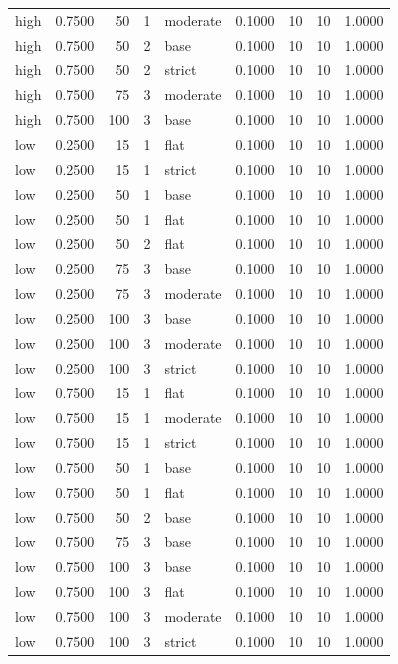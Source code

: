 \begin{tabular}{lrrrlrrrr}
high & 0.7500 & 50 & 1 & moderate & 0.1000 & 10 & 10 & 1.0000 \\
high & 0.7500 & 50 & 2 & base & 0.1000 & 10 & 10 & 1.0000 \\
high & 0.7500 & 50 & 2 & strict & 0.1000 & 10 & 10 & 1.0000 \\
high & 0.7500 & 75 & 3 & moderate & 0.1000 & 10 & 10 & 1.0000 \\
high & 0.7500 & 100 & 3 & base & 0.1000 & 10 & 10 & 1.0000 \\
low & 0.2500 & 15 & 1 & flat & 0.1000 & 10 & 10 & 1.0000 \\
low & 0.2500 & 15 & 1 & strict & 0.1000 & 10 & 10 & 1.0000 \\
low & 0.2500 & 50 & 1 & base & 0.1000 & 10 & 10 & 1.0000 \\
low & 0.2500 & 50 & 1 & flat & 0.1000 & 10 & 10 & 1.0000 \\
low & 0.2500 & 50 & 2 & flat & 0.1000 & 10 & 10 & 1.0000 \\
low & 0.2500 & 75 & 3 & base & 0.1000 & 10 & 10 & 1.0000 \\
low & 0.2500 & 75 & 3 & moderate & 0.1000 & 10 & 10 & 1.0000 \\
low & 0.2500 & 100 & 3 & base & 0.1000 & 10 & 10 & 1.0000 \\
low & 0.2500 & 100 & 3 & moderate & 0.1000 & 10 & 10 & 1.0000 \\
low & 0.2500 & 100 & 3 & strict & 0.1000 & 10 & 10 & 1.0000 \\
low & 0.7500 & 15 & 1 & flat & 0.1000 & 10 & 10 & 1.0000 \\
low & 0.7500 & 15 & 1 & moderate & 0.1000 & 10 & 10 & 1.0000 \\
low & 0.7500 & 15 & 1 & strict & 0.1000 & 10 & 10 & 1.0000 \\
low & 0.7500 & 50 & 1 & base & 0.1000 & 10 & 10 & 1.0000 \\
low & 0.7500 & 50 & 1 & flat & 0.1000 & 10 & 10 & 1.0000 \\
low & 0.7500 & 50 & 2 & base & 0.1000 & 10 & 10 & 1.0000 \\
low & 0.7500 & 75 & 3 & base & 0.1000 & 10 & 10 & 1.0000 \\
low & 0.7500 & 100 & 3 & base & 0.1000 & 10 & 10 & 1.0000 \\
low & 0.7500 & 100 & 3 & flat & 0.1000 & 10 & 10 & 1.0000 \\
low & 0.7500 & 100 & 3 & moderate & 0.1000 & 10 & 10 & 1.0000 \\
low & 0.7500 & 100 & 3 & strict & 0.1000 & 10 & 10 & 1.0000 \\

\end{tabular}
